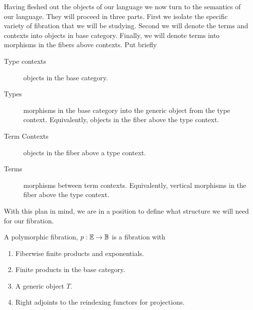Having fleshed out the objects of our language we now turn to the
semantics of our language. They will proceed in three parts. First we
isolate the specific variety of fibration that we will be
studying. Second we will denote the terms and contexts into objects in
base category. Finally, we will denote terms into morphisms in the
fibers above contexts. Put briefly
\begin{description}
\item[Type contexts] objects in the base category.
\item[Types] morphisms in the base category into the generic object
  from the type context. Equivalently, objects in the fiber above the
  type context.
\item[Term Contexts] objects in the fiber above a type context.
\item[Terms] morphisms between term contexts. Equivalently, vertical
  morphisms in the fiber above the type context.
\end{description}

With this plan in mind, we are in a position to define what structure
we will need for our fibration.
\begin{defn}\label{defn:systemf:polymorphicfibration}
  A polymorphic fibration, $p : \mathbb{E} \to \mathbb{B}$ is a fibration with
  \begin{enumerate}
  \item Fiberwise finite products and exponentials.
  \item Finite products in the base category.
  \item A generic object $T$.
  \item Right adjoints to the reindexing functors for projections.
  \end{enumerate}
\end{defn}
